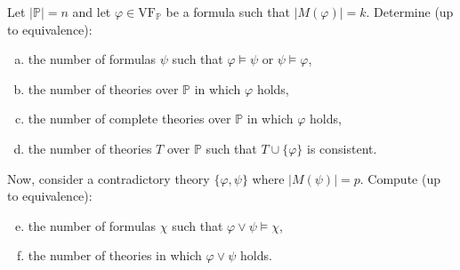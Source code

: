 \begin{problem}
    
    Let $|\mathbb{P}|=n$ and let $\varphi\in\mathrm{VF}_{\mathbb{P}}$ be a formula such that $|M(\varphi)|=k$. Determine (up to equivalence):
    \begin{enumerate}[(a)]
        \item the number of formulas $\psi$ such that $\varphi \models \psi$ or $\psi \models \varphi$,
        \item the number of theories over $\mathbb{P}$ in which $\varphi$ holds,
        \item the number of complete theories over $\mathbb{P}$ in which $\varphi$ holds,
        \item the number of theories $T$ over $\mathbb{P}$ such that $T \cup \{\varphi\}$ is consistent.
    \end{enumerate}
    Now, consider a contradictory theory $\{\varphi,\psi\}$ where $|M(\psi)|=p$.  Compute (up to equivalence):
    \begin{enumerate}[(a)]\setcounter{enumi}{4}
        \item the number of formulas $\chi$ such that $\varphi \vee \psi \models \chi$, 
        \item the number of theories in which $\varphi \vee \psi$ holds.
    \end{enumerate}


\end{problem}
